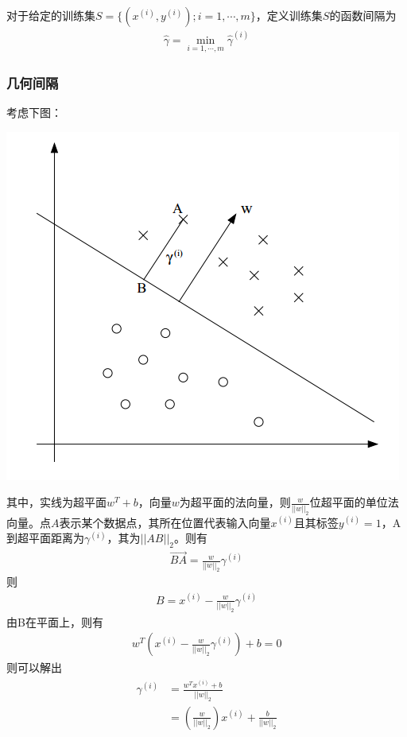 对于给定的训练集$S=\{(x^{(i)},y^{(i)});i=1,\cdots,m\}$，定义训练集$S$的函数间隔为
\begin{eqnarray}
\hat{\gamma}=\min_{i=1,\cdots,m}\hat{\gamma}^{(i)}
\end{eqnarray}
\subsubsection{几何间隔}
考虑下图：
\begin{center}
\includegraphics[scale=0.6]{../figures/SVM1.PNG} 
\end{center}
其中，实线为超平面$w^T+b$，向量$w$为超平面的法向量，则$\frac{w}{||w||_2}$位超平面的单位法向量。点$A$表示某个数据点，其所在位置代表输入向量$x^{(i)}$且其标签$y^{(i)}=1$，A到超平面距离为$\gamma^{(i)}$，其为$||AB||_2$。则有
\begin{eqnarray}
\overrightarrow{BA}=\frac{w}{||w||_2}\gamma^{(i)}
\end{eqnarray}
则
\begin{eqnarray}
B=x^{(i)}-\frac{w}{||w||_2}\gamma^{(i)}
\end{eqnarray}
由B在平面上，则有
\begin{eqnarray}
w^T\left( x^{(i)}-\frac{w}{||w||_2}\gamma^{(i)} \right)+b=0
\end{eqnarray}
则可以解出
\begin{eqnarray}
\begin{aligned}
\gamma^{(i)}&=\frac{w^Tx^{(i)}+b}{||w||_2}\\
&=\left(\frac{w}{||w||_2}\right)x^{(i)}+\frac{b}{||w||_2}
\end{aligned}
\end{eqnarray}

